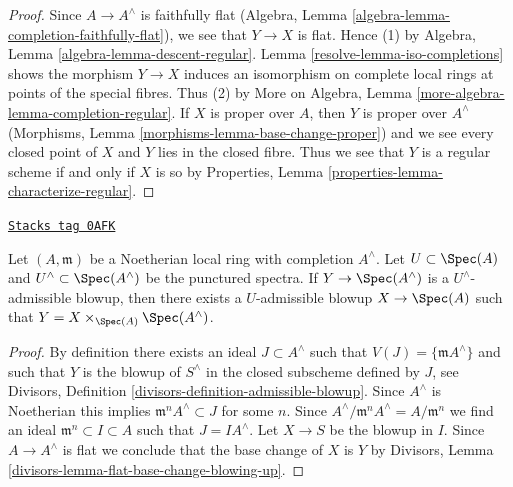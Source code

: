 \begin{proof}

Since $A \to A^\wedge$ is faithfully flat
(Algebra, Lemma \ref{algebra-lemma-completion-faithfully-flat}),
we see that $Y \to X$ is flat. Hence (1) by
Algebra, Lemma \ref{algebra-lemma-descent-regular}.
Lemma \ref{resolve-lemma-iso-completions} shows the morphism $Y \to X$
induces an isomorphism on complete local rings at points
of the special fibres. Thus (2) by
More on Algebra, Lemma \ref{more-algebra-lemma-completion-regular}.
If $X$ is proper over $A$, then $Y$ is proper over $A^\wedge$
(Morphisms, Lemma \ref{morphisms-lemma-base-change-proper})
and we see every closed point of $X$ and $Y$ lies in the closed fibre.
Thus we see that $Y$ is a regular scheme if and only if $X$ is so by
Properties, Lemma \ref{properties-lemma-characterize-regular}.
\end{proof}

\begin{lemma}
\label{resolve-lemma-descend-admissible-blowup}
\href{https://stacks.math.columbia.edu/tag/0AFK}{\texttt{Stacks tag 0AFK}}

Let $(A, \mathfrak m)$ be a Noetherian local ring with completion $A^\wedge$.
Let $U \subset \Spec(A)$ and $U^\wedge \subset \Spec(A^\wedge)$ be the
punctured spectra. If $Y \to \Spec(A^\wedge)$ is a $U^\wedge$-admissible
blowup, then there exists a $U$-admissible blowup $X \to \Spec(A)$
such that $Y = X \times_{\Spec(A)} \Spec(A^\wedge)$.
\end{lemma}

\begin{proof}
By definition there exists an ideal $J \subset A^\wedge$ such that
$V(J) = \{\mathfrak m A^\wedge\}$ and such that $Y$ is the blowup
of $S^\wedge$ in the closed subscheme defined by $J$, see
Divisors, Definition \ref{divisors-definition-admissible-blowup}.
Since $A^\wedge$ is Noetherian this implies
$\mathfrak m^n A^\wedge \subset J$ for some $n$.
Since $A^\wedge/\mathfrak m^n A^\wedge = A/\mathfrak m^n$
we find an ideal $\mathfrak m^n \subset I \subset A$
such that $J = I A^\wedge$. Let $X \to S$ be the blowup in $I$.
Since $A \to A^\wedge$ is flat
we conclude that the base change of $X$ is $Y$ by
Divisors, Lemma \ref{divisors-lemma-flat-base-change-blowing-up}.
\end{proof}

